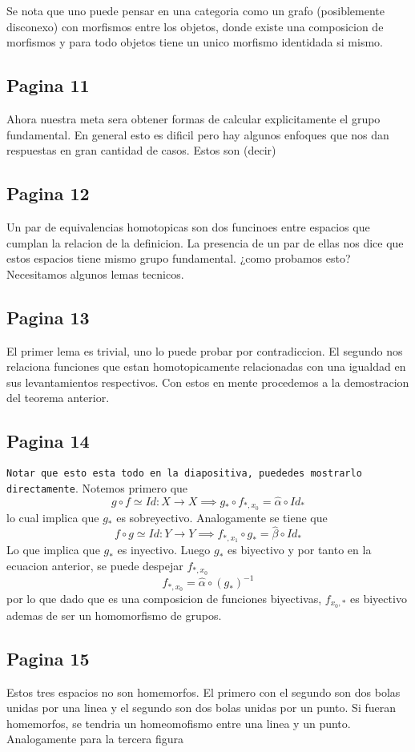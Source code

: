 \documentclass[letterpaper]{article}
\begin{document}
Se nota que uno puede pensar en una categoria como un grafo
(posiblemente disconexo) con morfismos entre los objetos, donde existe
una composicion de morfismos y para todo objetos tiene un unico morfismo
identidada si mismo.

\subsection*{Pagina 11}
Ahora nuestra meta sera obtener formas de calcular explicitamente el
grupo fundamental. En general esto es dificil pero hay algunos enfoques
que nos dan respuestas en gran cantidad de casos. Estos son (decir)

\subsection*{Pagina 12}
Un par de equivalencias homotopicas son dos funcinoes entre espacios que
cumplan la relacion de la definicion. La presencia de un par de ellas
nos dice que estos espacios tiene mismo grupo fundamental. ¿como
probamos esto? Necesitamos algunos lemas tecnicos.

\subsection*{Pagina 13}
El primer lema es trivial, uno lo puede probar por contradiccion. El
segundo nos relaciona funciones que estan homotopicamente relacionadas
con una igualdad en sus levantamientos respectivos. Con estos en mente
procedemos a la demostracion del teorema anterior.

\subsection*{Pagina 14}
\texttt{Notar que esto esta todo en la diapositiva, puededes mostrarlo directamente}.
Notemos primero que
\[ g \circ f \simeq Id : X \to X \implies g_* \circ f_{*,x_0} = \hat
  \alpha \circ Id_* \]
lo cual implica que \(g_*\) es sobreyectivo. Analogamente se tiene que
\[ f \circ g \simeq Id : Y \to Y \implies f_{*,x_1} \circ g_* = \hat
  \beta \circ Id_* \]
Lo que implica que \(g_*\) es inyectivo. Luego \(g_*\) es biyectivo y
por tanto en la ecuacion anterior, se puede despejar \(f_{*,x_0}\)
\[ f_{*,x_0} = \hat \alpha \circ \left( g_{*} \right)^{-1}\]
por lo que dado que es una composicion de funciones biyectivas,
\(f_{x_0,*}\) es biyectivo ademas de ser un homomorfismo de grupos.

\subsection*{Pagina 15}
Estos tres espacios no son homemorfos. El primero con el segundo son dos
bolas unidas por una linea y el segundo son dos bolas unidas por un
punto. Si fueran homemorfos, se tendria un homeomofismo entre una linea
y un punto. Analogamente para la tercera figura
\end{document}
